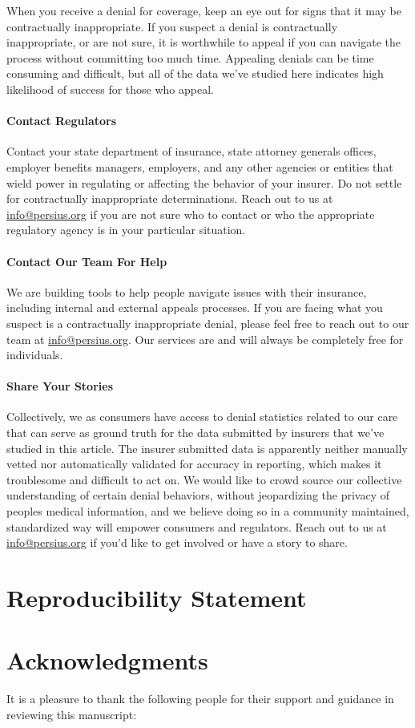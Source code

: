 \documentclass[12pt, a4paper,twoside]{report}
\theoremstyle{plain} %
\theoremstyle{definition} %
\theoremstyle{remark} %
\numberwithin{equation}{chapter}
\begin{document}
		When you receive a denial for coverage, keep an eye out for signs that it may be contractually inappropriate. If you suspect a denial is contractually inappropriate, or are not sure, it is worthwhile to appeal if you can navigate the process without committing too much time. Appealing denials can be time consuming and difficult, but all of the data we've studied here indicates high likelihood of success for those who appeal.
		
		\subsubsection{Contact Regulators}
		
		Contact your state department of insurance, state attorney generals offices, employer benefits managers, employers, and any other agencies or entities that wield power in regulating or affecting the behavior of your insurer. Do not settle for contractually inappropriate determinations. Reach out to us at \href{info@persius.org}{info@persius.org} if you are not sure who to contact or who the appropriate regulatory agency is in your particular situation.
		
		\subsubsection{Contact Our Team For Help}
		
		We are building tools to help people navigate issues with their insurance, including internal and external appeals processes. If you are facing what you suspect is a contractually inappropriate denial, please feel free to reach out to our team at \href{info@persius.org}{info@persius.org}. Our services are and will always be completely free for individuals.
		
		\subsubsection{Share Your Stories}
		
		Collectively, we as consumers have access to denial statistics related to our care that can serve as ground truth for the data submitted by insurers that we've studied in this article. The insurer submitted data is apparently neither manually vetted nor automatically validated for accuracy in reporting, which makes it troublesome and difficult to act on. We would like to crowd source our collective understanding of certain denial behaviors, without jeopardizing the privacy of peoples medical information, and we believe doing so in a community maintained, standardized way will empower consumers and regulators. Reach out to us at \href{info@persius.org}{info@persius.org} if you'd like to get involved or have a story to share.
		
		\chapter{Reproducibility Statement}\label{reproducibilitystatement}
		
		
		\chapter{Acknowledgments}
		It is a pleasure to thank the following people for their support and guidance in reviewing this manuscript:
		
		
		
		
		
		
		
	
\end{document}
